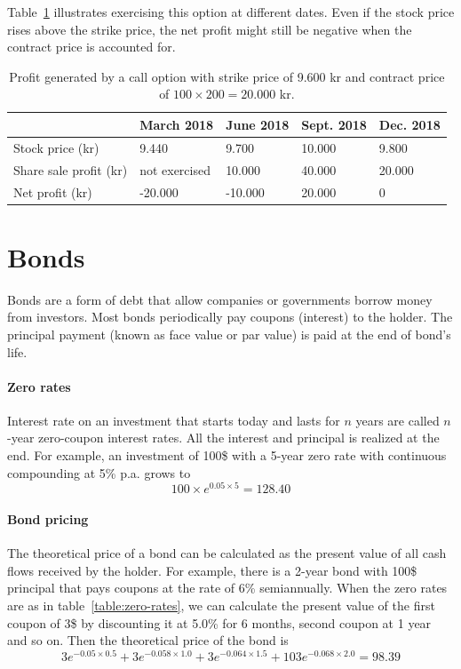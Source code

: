 Table~\ref{table:option-sell} illustrates exercising this option at different dates. Even if the stock price rises above the strike price, the net profit might still be negative when the contract price is accounted for.  

\begin{table}[h]
\centering
\caption{Profit generated by a call option with strike price of 9.600 kr and contract price of $100 \times 200 = 20.000$ kr.}
\label{table:option-sell}
\begin{tabular}{|l|l|l|l|l|}
\hline
                       & March 2018    & June 2018 & Sept. 2018 & Dec. 2018 \\ \hline
Stock price (kr)       & 9.440         & 9.700     & 10.000         & 9.800         \\ \hline
Share sale profit (kr) & not exercised & 10.000    & 40.000         & 20.000        \\ \hline
Net profit (kr)        & -20.000       & -10.000   & 20.000         & 0             \\ \hline
\end{tabular}
\end{table}

\section{Bonds}
Bonds are a form of debt that allow companies or governments borrow money from investors. Most bonds periodically pay coupons (interest) to the holder. The principal payment (known as face value or par value) is paid at the end of bond's life.~\cite[pg.80]{ofod}

\paragraph{Zero rates}
Interest rate on an investment that starts today and lasts for $n$ years are called $n$-year zero-coupon interest rates. All the interest and principal is realized at the end. For example, an investment of 100\$ with a 5-year zero rate with continuous compounding at 5\% p.a. grows to~\cite[pg.80]{ofod}
\begin{equation*}
    100 \times e^{0.05 \times 5} = 128.40
\end{equation*}

\paragraph{Bond pricing}
The theoretical price of a bond can be calculated as the present value of all cash flows received by the holder. For example, there is a 2-year bond with 100\$ principal that pays coupons at the rate of 6\% semiannually. When the zero rates are as in table~\ref{table:zero-rates}, we can calculate the present value of the first coupon of 3\$ by discounting it at 5.0\% for 6 months, second coupon at 1 year and so on. Then the theoretical price of the bond is~\cite[pg.80-81]{ofod}
\begin{equation*}
    3e^{-0.05 \times 0.5} + 3e^{-0.058 \times 1.0} + 3e^{-0.064 \times 1.5} + 103e^{-0.068 \times 2.0} = 98.39
\end{equation*}

